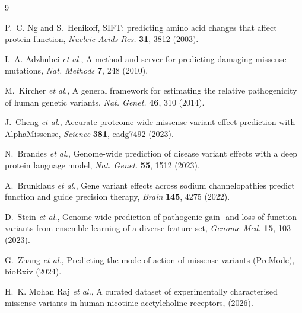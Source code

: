 \documentclass{ws-procs11x85}
\begin{document}
\begin{thebibliography}{9}

 P.~C. Ng and S.~Henikoff, SIFT: predicting amino acid
changes that affect protein function, {\em Nucleic Acids Res.}
{\bf 31}, 3812 (2003).

 I.~A. Adzhubei {\em et al.}, A method and server
for predicting damaging missense mutations, {\em Nat. Methods}
{\bf 7}, 248 (2010).

 M.~Kircher {\em et al.}, A general framework for
estimating the relative pathogenicity of human genetic variants,
{\em Nat. Genet.} {\bf 46}, 310 (2014).

 J.~Cheng {\em et al.}, Accurate proteome-wide
missense variant effect prediction with AlphaMissense, {\em Science}
{\bf 381}, eadg7492 (2023).

 N.~Brandes {\em et al.}, Genome-wide prediction of
disease variant effects with a deep protein language model,
{\em Nat. Genet.} {\bf 55}, 1512 (2023).

 A.~Brunklaus {\em et al.}, Gene variant effects
across sodium channelopathies predict function and guide precision
therapy, {\em Brain} {\bf 145}, 4275 (2022).

 D.~Stein {\em et al.}, Genome-wide prediction of
pathogenic gain- and loss-of-function variants from ensemble learning
of a diverse feature set, {\em Genome Med.} {\bf 15}, 103 (2023).

 G.~Zhang {\em et al.}, Predicting the mode of action
of missense variants (PreMode), bioRxiv (2024).

 H.~K. Mohan Raj {\em et al.}, A curated dataset of
experimentally characterised missense variants in human nicotinic
acetylcholine receptors, (2026).


\end{thebibliography}
\end{document}

